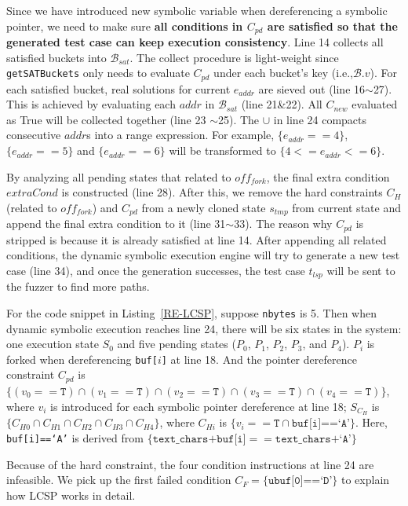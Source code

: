 \documentclass{cta-author}
\begin{document}
Since we have introduced new symbolic variable when dereferencing a symbolic pointer,
we need to make sure \textbf{all conditions in $C_{pd}$ are satisfied so that the generated
test case can keep execution consistency}.
Line 14 collects all satisfied buckets into $\mathcal{B}_{sat}$. The collect procedure
is light-weight since \texttt{getSATBuckets} only needs to evaluate $C_{pd}$
under each bucket's key (i.e.,$\mathcal{B}.v$).
For each satisfied bucket, real solutions for current $e_{addr}$ are sieved out 
(line 16$\sim$27). This is achieved by evaluating each $addr$ in $\mathcal{B}_{sat}$
(line 21\&22). All $C_{new}$ evaluated as True will be collected together (line 23
$\sim$25). The $\cup$ in line 24 compacts consecutive $addr$s into a range expression.
For example, $\{e_{addr}==4\}$, $\{e_{addr}==5\}$ and $\{e_{addr}==6\}$ will be transformed to
$\{4<=e_{addr}<=6\}$.

By analyzing all pending states that related to $off_{fork}$, 
the final extra condition $extraCond$ is constructed (line 28).
After this, we remove the hard constraints $C_H$ (related to $off_{fork}$) and $C_{pd}$ from a newly cloned state $s_{tmp}$
from current state and append
the final extra condition to it (line 31$\sim$33). 
The reason why $C_{pd}$ is stripped is because it is already satisfied at line 14.
After appending all related conditions, the dynamic symbolic execution 
engine will try to generate a new test case (line 34), and once the 
generation successes, the test case $t_{lsp}$ will be sent to the 
fuzzer to find more paths.

For the code snippet in Listing~\ref{RE-LCSP}, suppose \texttt{nbytes} is 5. 
Then when dynamic symbolic execution reaches line 24, there will be 
six states in the system: one execution state $S_0$ and five pending 
states ($P_0$, $P_1$, $P_2$, $P_3$, and $P_4$). $P_i$ is forked when 
dereferencing \texttt{buf[$i$]} at line 18. And the pointer dereference
constraint $C_{pd}$ is 
$\{(v_0==\texttt{T})\cap (v_1==\texttt{T})\cap (v_2==\texttt{T})\cap (v_3==\texttt{T})\cap (v_4==\texttt{T})\}$,
where $v_i$ is introduced for each symbolic pointer dereference at
line 18; $S_{C_H}$ is $\{C_{H0}\cap C_{H1}\cap C_{H2}\cap C_{H3}\cap C_{H4}\}$,
where $C_{Hi}$ is $\{v_i==\texttt{T}\cap \texttt{buf[i]==`A'}\}$. Here, \texttt{buf[i]==`A'} is derived from $\{\texttt{text\_chars+buf[i]}==\texttt{text\_chars+`A'}\}$

Because of the hard constraint, the four condition instructions at line 24
are infeasible. We pick up the first failed condition 
$C_F=\{\texttt{ubuf[0]==`D'}\}$ to explain how LCSP works in detail.
\end{document}
